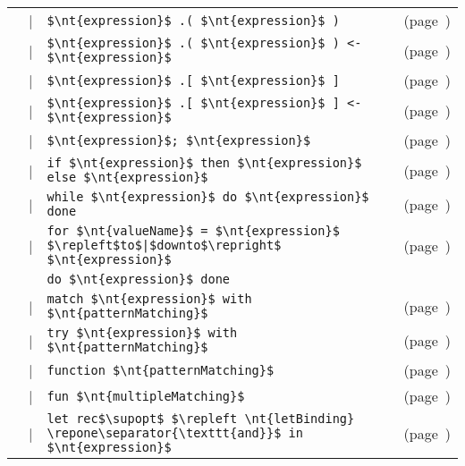 \begin{center}
\begin{tabular}{rcll}
& | & \hbox{\lstinline/$\nt{expression}$ .( $\nt{expression}$ )/} & (page~\pageref{keyword:.(})\\
& | & \hbox{\lstinline/$\nt{expression}$ .( $\nt{expression}$ ) <- $\nt{expression}$/} & (page~\pageref{keyword:<-(array-field-assignment)})\\
& | & \hbox{\lstinline/$\nt{expression}$ .[ $\nt{expression}$ ]/} & (page~\pageref{keyword:string-subscript})\\
& | & \hbox{\lstinline/$\nt{expression}$ .[ $\nt{expression}$ ] <- $\nt{expression}$/} & (page~\pageref{keyword:<-(string-assignment)})\\
& | & \hbox{\lstinline/$\nt{expression}$; $\nt{expression}$/} & (page~\pageref{keyword:;(sequencing)})\\
& | & \hbox{\lstinline/if $\nt{expression}$ then $\nt{expression}$ else $\nt{expression}$/} & (page~\pageref{keyword:if})\\
& | & \hbox{\lstinline/while $\nt{expression}$ do $\nt{expression}$ done/} & (page~\pageref{keyword:while})\\
& | & \hbox{\lstinline/for $\nt{valueName}$ = $\nt{expression}$ $\repleft$to$|$downto$\repright$ $\nt{expression}$/} & (page~\pageref{keyword:for})\\
&   & \hbox{\lstinline/do $\nt{expression}$ done/}\\
& | & \hbox{\lstinline/match $\nt{expression}$ with $\nt{patternMatching}$/} & (page~\pageref{keyword:match})\\
& | & \hbox{\lstinline/try $\nt{expression}$ with $\nt{patternMatching}$/} & (page~\pageref{keyword:try})\\
& | & \hbox{\lstinline/function $\nt{patternMatching}$/} & (page~\pageref{keyword:function})\\
& | & \hbox{\lstinline/fun $\nt{multipleMatching}$/} & (page~\pageref{keyword:fun})\\
& | & \hbox{\lstinline/let rec$\supopt$ $\repleft \nt{letBinding} \repone\separator{\texttt{and}}$ in $\nt{expression}$/} & (page~\pageref{keyword:let})
\end{tabular}
\end{center}

